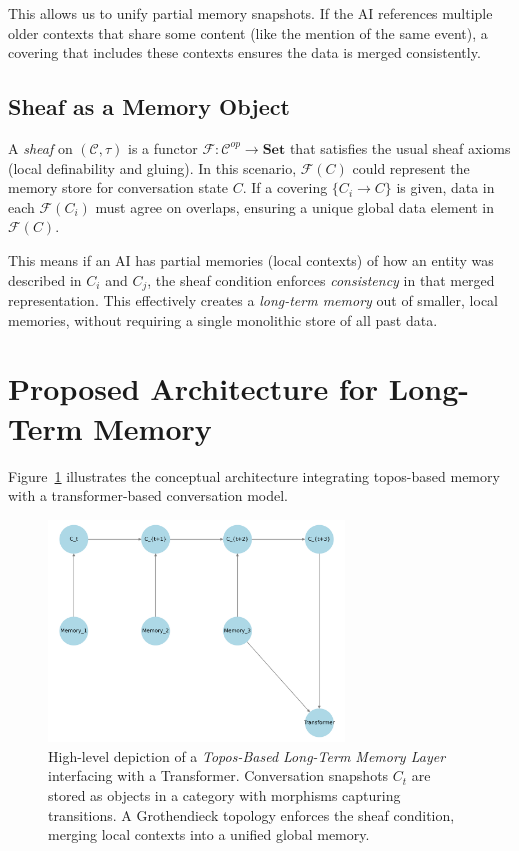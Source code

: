 \documentclass{article}
\begin{document}
This allows us to unify partial memory snapshots. If the AI references multiple older contexts that share some content (like the mention of the same event), a covering that includes these contexts ensures the data is merged consistently.

\subsection{Sheaf as a Memory Object}
\label{subsec:sheaf_memory}

A \emph{sheaf} on \((\mathcal{C}, \tau)\) is a functor \(\mathcal{F}: \mathcal{C}^{op} \to \mathbf{Set}\) that satisfies the usual sheaf axioms (local definability and gluing). In this scenario, $\mathcal{F}(C)$ could represent the memory store for conversation state \(C\). If a covering \(\{C_i \to C\}\) is given, data in each $\mathcal{F}(C_i)$ must agree on overlaps, ensuring a unique global data element in \(\mathcal{F}(C)\). 

This means if an AI has partial memories (local contexts) of how an entity was described in $C_i$ and $C_j$, the sheaf condition enforces \emph{consistency} in that merged representation. This effectively creates a \emph{long-term memory} out of smaller, local memories, without requiring a single monolithic store of all past data.

\section{Proposed Architecture for Long-Term Memory}
\label{sec:proposed_architecture}

Figure~\ref{fig:architecture} illustrates the conceptual architecture integrating topos-based memory with a transformer-based conversation model.

\begin{figure}[ht]
\centering
\includegraphics[width=0.7\textwidth]{topos_memory_architecture.png}
\caption{High-level depiction of a \emph{Topos-Based Long-Term Memory Layer} interfacing with a Transformer. Conversation snapshots $C_t$ are stored as objects in a category with morphisms capturing transitions. A Grothendieck topology enforces the sheaf condition, merging local contexts into a unified global memory.}
\label{fig:architecture}
\end{figure}
\end{document}

